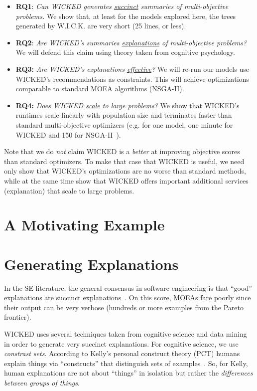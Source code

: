 \documentclass[runningheads]{llncs}
\newcommand{\bi}{\begin{itemize}}
\newcommand{\ei}{\end{itemize}}
\begin{document}
\bi
\item[{\bf RQ1}:] {\em Can WICKED generates \underline{succinct} summaries of multi-objective problems.} 
We show that, at least for the models explored here, the trees
generated by W.I.C.K. are very short (25 lines, or less).
\item[{\bf RQ2}:] {\em Are WICKED's summaries \underline{explanations} of multi-objective problems?}
We will defend this claim using theory taken from cognitive psychology.
\item[{\bf RQ3:}] {\em Are WICKED's  explanations \underline{effective}?}
We will re-run our models use WICKED's 
recommendations as constraints. This will  achieve optimizations comparable
to standard MOEA algorithms (NSGA-II).
\item [{\bf RQ4:}] {\em Does WICKED \underline{scale} to large problems?}
 We show that WICKED's
runtimes scale linearly with population size and terminates
faster than standard multi-objective optimizers
 (e.g. for one model, one minute for WICKED and 150 for NSGA-II~\cite{deb00a}).
\ei
Note that we do {\em not} claim WICKED is a
{\em better} at improving objective
scores than standard optimizers.  To make that case that WICKED is useful,
we need only show that WICKED's optimizations are no worse than standard methods,
while at the same time show that WICKED offers important additional services (explanation)
that scale to large problems.


\section{A Motivating Example}




\section{Generating Explanations}
In the SE literature,
the general consensus in
software engineering is that ``good'' explanations
are succinct explanations~\cite{ag98,dej13z,fenton99}.
On this score, MOEAs fare poorly since their output can be very verbose
(hundreds or more examples from the Pareto frontier).

WICKED uses several techniques taken from cognitive science
and data mining in order to generate very succinct explanations.
For cognitive science, we use {\em constrast sets}.
According to Kelly's personal
construct theory (PCT) humans explain things via
``constructs'' that distinguish sets of examples~\cite{kelly55}.
So, for Kelly, human explanations are not about
``things'' in isolation but rather the {\em
differences between groups of things}. 
\end{document}
